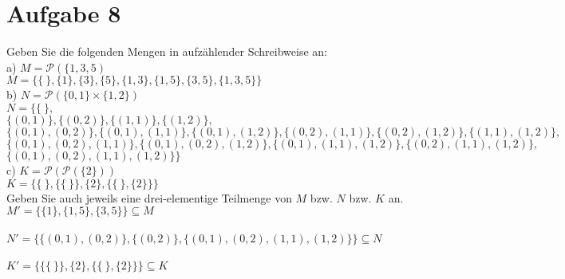 \section*{Aufgabe 8}

Geben Sie die folgenden Mengen in aufzählender Schreibweise an:\\

a) $M = \mathcal{P}(\{1,3,5)$\\

$M = \{ \{ \ \}, \{1\}, \{3\}, \{5\}, \{1,3\}, \{1,5\}, \{3,5\}, \{1,3,5\}\}$\\

b) $N = \mathcal{P}(\{0,1\} \times \{1,2\})$\\

$N = \{ \{ \ \},$\\
\hspace*{2.8em}$\{(0,1)\}, \{(0,2)\}, \{(1,1)\}, \{(1,2)\},$\\
\hspace*{2.8em}$\{(0,1),(0,2)\}, \{(0,1),(1,1)\}, \{(0,1),(1,2)\}, \{(0,2),(1,1)\}, \{(0,2),(1,2)\}, \{(1,1),(1,2)\},$\\
\hspace*{2.8em}$\{(0,1),(0,2),(1,1)\}, \{(0,1),(0,2),(1,2)\}, \{(0,1),(1,1),(1,2)\}, \{(0,2),(1,1),(1,2)\},$\\
\hspace*{2.8em}$\{(0,1),(0,2),(1,1),(1,2)\}\}$\\

c) $K = \mathcal{P}(\mathcal{P}(\{2\}))$\\

$K = \{\{ \ \}, \{ \{ \ \} \}, \{2\}, \{\{ \ \}, \{2\}\}\}$\\

Geben Sie auch jeweils eine drei-elementige Teilmenge von $M$ bzw. $N$ bzw. $K$ an.\\

$M' = \{ \{1\}, \{1,5\}, \{3,5\} \} \subseteq M$\\~\\

$N' = \{ \{(0,1),(0,2)\}, \{(0,2)\}, \{(0,1),(0,2),(1,1),(1,2)\} \} \subseteq N$\\~\\

$K' = \{ \{ \{ \ \} \}, \{2\}, \{\{ \ \}, \{2\}\} \} \subseteq K$

\newpage

